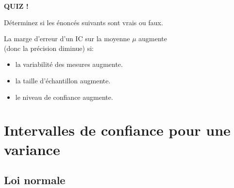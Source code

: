 \documentclass{BeamerTemplate}
\begin{document}
\begin{frame}[t]{ }

\centerline{\LARGE\bf \alert{QUIZ !}}
\bigskip
Déterminez si les énoncés suivants sont vrais ou faux.
\vspace{0.3cm}

La marge d'erreur d'un IC sur la moyenne $\mu$ augmente \\(donc la précision diminue) si:
\vspace{0.3cm}

\begin{itemize}\itemsep1cm
  \item la variabilité des mesures augmente.
  \item la taille d'échantillon augmente.
  \item le niveau de confiance augmente.
\end{itemize}

\end{frame}


\section[IC pour une variance]{Intervalles de confiance pour une variance}

\subsection{Loi normale}
\end{document}
